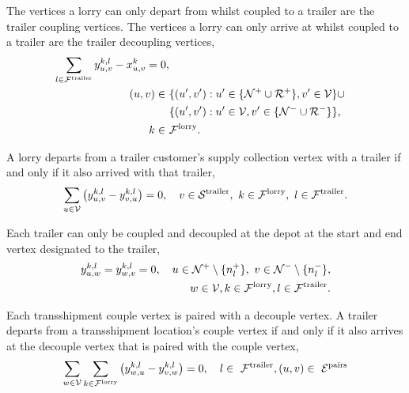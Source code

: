 The vertices a lorry can only depart from whilst coupled to a trailer are the trailer coupling vertices.
The vertices a lorry can only arrive at whilst coupled to a trailer are the trailer decoupling vertices,
\begin{align}
   \sum_{l \in \mathcal F^{\rm trailer}}
   y^{k,l}_{u,v}  - x^k_{u,v} = 0 ,  \\
   (u,v) \in \
    &  \{ (u',v'): u' \in  \{  \mathcal N^+ \cup  \mathcal R^+  \}   , v' \in \mathcal V   \}
   \cup \notag \\
    & \{  (u',v'): u' \in \mathcal V,  v' \in \{ \mathcal N^- \cup \mathcal R^-  \} \}, \notag\\
     k  \in \ &   \mathcal F^{\rm lorry}. \notag
\end{align}





A lorry departs from a trailer customer's supply collection vertex with a trailer if and only if it also arrived with that trailer,
\begin{align}
   \sum_{u \in \mathcal V}
   \left(  y^{k,l}_{u,v} - y^{k,l}_{v,u}  \right) =
   0,  \quad  v \in  \mathcal S^{\rm trailer},
   \ k \in \mathcal F^{\rm lorry},
   \ l \in \mathcal F^{\rm trailer} .
\end{align}


Each trailer can only be coupled and decoupled at the depot at the start and end vertex designated to the trailer,
\begin{align}
     y^{k,l}_{u,w}  = y^{k,l}_{w,v}  =   0, \quad
     u \in \mathcal N^+ \setminus \{ n^+_l \}, \ v \in \mathcal N^- \setminus \{ n^-_l \} , \\
     w \in \mathcal V,
     k \in \mathcal F^{\rm lorry},
     l \in \mathcal F^{\rm trailer}. \notag
\end{align}


Each transshipment couple vertex is paired with a decouple vertex.
A trailer departs from a transshipment location's couple vertex if and only if it also arrives at the decouple vertex that is paired with the couple vertex,
\begin{align}
     \sum_{w \in \mathcal V}  \sum_{k \in \mathcal F^{\rm lorry} }
     \left( y^{k,l}_{w,u}  - y^{k,l}_{v,w} \right) = 0 , \quad
     l \in \  \mathcal F^{\rm trailer},
      (u,v) \in \ \mathcal E^{\rm pairs}
\end{align}




